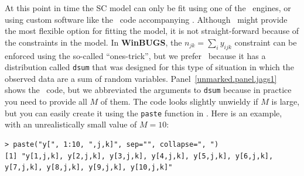 At this point in time the SC model can only be fit using one of the
\bugs~engines, or using custom software like the \R~code accompanying
\citet{chandler_royle:2012}. Although \bugs~might provide the most
flexible option for fitting the model, it is not
straight-forward because of the
constraints in the model. In \textbf{WinBUGS}, the
$n_{jk} = \sum_i y_{ijk}$
constraint can be
enforced using the so-called ``ones-trick'', but we prefer
\jags~because it has a distribution
called \verb+dsum+ that was designed for this type
of situation in which the observed data are a sum of random
variables. %
Panel~\ref{unmarked.panel.jags1} shows the \jags~code, but
we abbreviated the
arguments to \verb+dsum+ because in practice you need to provide all $M$ of
them. %
The code looks slightly unwieldy if $M$ is large, but you can easily create
it using the \verb+paste+ function in \R. Here is an example, with an
unrealistically small value of $M=10$:
\begin{small}
\begin{verbatim}
> paste("y[", 1:10, ",j,k]", sep="", collapse=", ")
[1] "y[1,j,k], y[2,j,k], y[3,j,k], y[4,j,k], y[5,j,k], y[6,j,k],
y[7,j,k], y[8,j,k], y[9,j,k], y[10,j,k]"
\end{verbatim}
\end{small}

